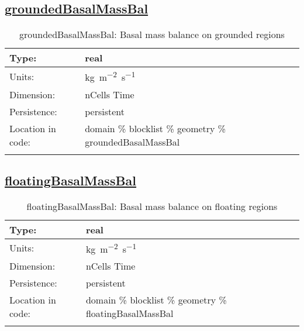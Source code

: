 \subsection[groundedBasalMassBal]{\hyperref[sec:var_tab_geometry]{groundedBasalMassBal}}
\label{subsec:var_sec_geometry_groundedBasalMassBal}
\begin{center}
\begin{longtable}{| p{2.0in} | p{4.0in} |}
        \hline 
        Type: & real \\
        \hline 
        Units: & \si{kg.m^{-2}.s^{-1}} \\
        \hline 
        Dimension: & nCells Time \\
        \hline 
        Persistence: & persistent \\
        \hline 
         Location in code: & domain \% blocklist \% geometry \% groundedBasalMassBal \\
         \hline 
    \caption{groundedBasalMassBal: Basal mass balance on grounded regions}
\end{longtable}
\end{center}
\subsection[floatingBasalMassBal]{\hyperref[sec:var_tab_geometry]{floatingBasalMassBal}}
\label{subsec:var_sec_geometry_floatingBasalMassBal}
\begin{center}
\begin{longtable}{| p{2.0in} | p{4.0in} |}
        \hline 
        Type: & real \\
        \hline 
        Units: & \si{kg.m^{-2}.s^{-1}} \\
        \hline 
        Dimension: & nCells Time \\
        \hline 
        Persistence: & persistent \\
        \hline 
         Location in code: & domain \% blocklist \% geometry \% floatingBasalMassBal \\
         \hline 
    \caption{floatingBasalMassBal: Basal mass balance on floating regions}
\end{longtable}
\end{center}
